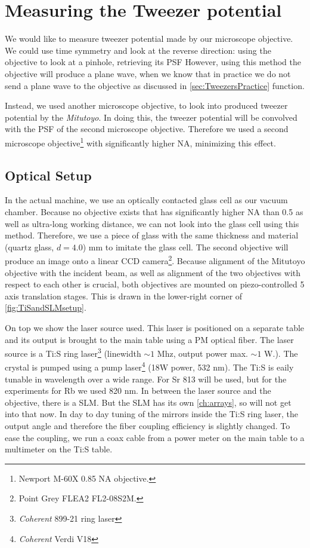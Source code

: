 \section{Measuring the Tweezer potential}\label{sec:MeasuringTweezer}

We would like to measure tweezer potential made by our microscope objective. 
We could use time symmetry and look at the reverse direction: using the objective to look at a pinhole, retrieving its \acf{PSF} \cite{Knottnerus2018,Sortais2007}
However, using this method the objective will produce a plane wave, when we know that in practice we do not send a plane wave to the objective as discussed in \cref{sec:TweezersPractice}
function. 

Instead, we used another microscope objective, to look into produced tweezer potential by the \textit{Mitutoyo}. 
In doing this, the tweezer potential will be convolved with the \ac{PSF} of the second microscope objective\cite{Baumgaertner2017}.
Therefore we used a second microscope objective\footnote{Newport M-60X 0.85 NA objective.} with significantly higher \ac{NA}, minimizing this effect. 

\subsection{Optical Setup}

In the actual machine, we use an optically contacted glass cell as our vacuum chamber. Because no objective exists that has significantly higher NA than 0.5 as well as ultra-long working distance, we can not look into the glass cell using this method. Therefore, we use a piece of glass with the same thickness and material (quartz glass, $d = 4.0$) mm to imitate the glass cell. The second objective will produce an image onto a linear CCD camera\footnote{Point Grey FLEA2 FL2-08S2M.}. Because alignment of the Mitutoyo objective with the incident beam, as well as alignment of the two objectives with respect to each other is crucial, both objectives are mounted on piezo-controlled 5 axis translation stages. 
This is drawn in the lower-right corner of \cref{fig:TiSandSLMsetup}.

On top we show the laser source used.
This laser is positioned on a separate table and its output is brought to the main table using a \ac{PM} optical fiber. 
The laser source is a \ac{Ti:S} ring laser\footnote{\textit{Coherent} 899-21 ring laser} (linewidth $\sim 1$ Mhz, output power max. $\sim 1$ W.). 
The crystal is pumped using a pump laser\footnote{\textit{Coherent} Verdi V18} (18W power, 532 nm). 
The \ac{Ti:S} is eaily tunable in wavelength over a wide range. For Sr 813 will be used, but for the experiments for Rb we used 820 nm. 
In between the laser source and the objective, there is a \ac{SLM}. But the SLM has its own \cref{ch:arrays}, so will not get into that now. 
In day to day tuning of the mirrors inside the Ti:S ring laser, the output angle and therefore the fiber coupling efficiency is slightly changed. 
To ease the coupling, we run a coax cable from a power meter on the main table to a multimeter on the Ti:S table. 

